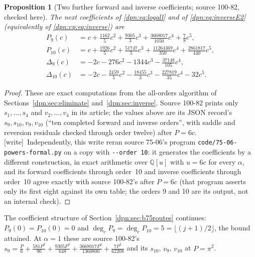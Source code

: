 \documentclass[11pt]{article}
\numberwithin{equation}{section}
\newtheorem{proposition}[theorem]{Proposition}
\theoremstyle{definition}\newtheorem{definition}[theorem]{Definition}
\theoremstyle{remark}\newtheorem{remark}[theorem]{Remark}
\newcommand{\file}[1]{\nolinkurl{#1}}
\newcommand{\wrt}{\textup{[write]}}
\begin{document}
\begin{proposition}[Two further forward and inverse coefficients; source 100-82, checked here]\label{dpn:rb:prop:P910}
The next coefficients of \eqref{dpn:eq:logall} and of
\eqref{dpn:eq:inverseE2} (equivalently of \eqref{dpn:cp:eq:inverse}) are
\begin{align}
 P_9(c)&=c+\tfrac{1162}5c^2+\tfrac{9305}3c^3+\tfrac{3668017}{1050}c^4
        +\tfrac78c^5,\label{dpn:rb:eq:P9}\\
 P_{10}(c)&=c+\tfrac{1926}5c^2+\tfrac{51747}5c^3+\tfrac{11264369}{350}c^4
        +\tfrac{2861817}{440}c^5,\label{dpn:rb:eq:P10}\\
 \Delta_9(c)&=-2c-276c^2-1344c^3-\tfrac{37148}{105}c^4,\label{dpn:rb:eq:D9}\\
 \Delta_{10}(c)&=-2c-\tfrac{2459}5c^2-\tfrac{18455}3c^3-\tfrac{227819}{35}c^4
        -32c^5.\label{dpn:rb:eq:D10}
\end{align}
\end{proposition}
\begin{proof}
These are exact computations from the all-orders algorithm of
Sections~\ref{dpn:sec:eliminate} and~\ref{dpn:sec:inverse}.  Source 100-82
prints only $s_1,\dots,s_4$ and $v_2,\dots,v_4$ in its article; the values
above are its JSON record's $s_9,s_{10},v_9,v_{10}$ (``ten completed forward
and inverse orders'', with saddle and reversion residuals checked through
order twelve) after $P=6c$.  \wrt\ Independently, this write reran source
75-06's program \file{code/75-06-powers-formal.py} on a copy with
\texttt{-{}-order 10}: it generates the coefficients by a different
construction, in exact arithmetic over $\mathbb Q[u]$ with $u=6c$ for every
$\alpha$, and its forward coefficients through order~10 and inverse
coefficients through order~10 agree exactly with source 100-82's after $P=6c$
(that program asserts only its first eight against its own table; the
orders 9 and 10 are its output, not an internal check).
\end{proof}
The coefficient structure of Section~\ref{dpn:sec:b75routes} continues:
$P_9(0)=P_{10}(0)=0$ and $\deg_cP_9=\deg_cP_{10}=5=\lfloor(j+1)/2\rfloor$, the
bound attained.  At $\alpha=1$ these are source 100-82's
$s_9=\frac P6+\frac{581P^2}{90}+\frac{9305P^3}{648}+\frac{3668017P^4}{1360800}
+\frac{7P^5}{62208}$ and its $s_{10}$, $v_9$, $v_{10}$ at $P=\pi^2$.
\end{document}
